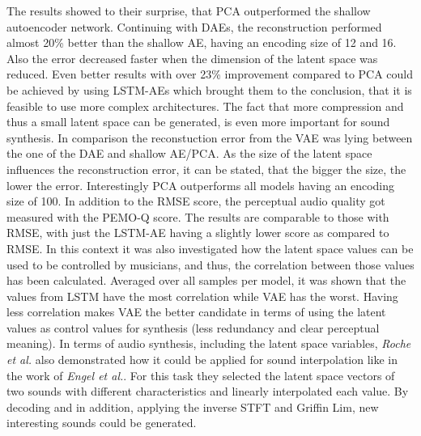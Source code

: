The results showed to their surprise, that PCA outperformed the shallow autoencoder network. Continuing with DAEs, the reconstruction performed almost 20\% better than the shallow AE, having an encoding size of 12 and 16. Also the error decreased faster when the dimension of the latent space was reduced. Even better results with over 23\% improvement compared to PCA could be achieved by using LSTM-AEs which brought them to the conclusion, that it is feasible to use more complex architectures. The fact that more compression and thus a small latent space can be generated, is even more important for sound synthesis. In comparison the reconstuction error from the VAE was lying between the one of the DAE and shallow AE/PCA. As the size of the latent space influences the reconstruction error, it can be stated, that the bigger the size, the lower the error. Interestingly PCA outperforms all models having an encoding size of 100. In addition to the RMSE score, the perceptual audio quality got measured with the PEMO-Q score. The results are comparable to those with RMSE, with just the LSTM-AE having a slightly lower score as compared to RMSE. In this context it was also investigated how the latent space values can be used to be controlled by musicians, and thus, the correlation between those values has been calculated. Averaged over all samples per model, it was shown that the values from LSTM have the most correlation while VAE has the worst. Having less correlation makes VAE the better candidate in terms of using the latent values as control values for synthesis (less redundancy and clear perceptual meaning). In terms of audio synthesis, including the latent space variables, \textit{Roche et al.} also demonstrated how it could be applied for sound interpolation like in the work of \textit{Engel et al.}. For this task they selected the latent space vectors of two sounds with different characteristics and linearly interpolated each value. By decoding and in addition, applying the inverse STFT and Griffin Lim, new interesting sounds could be generated. 

